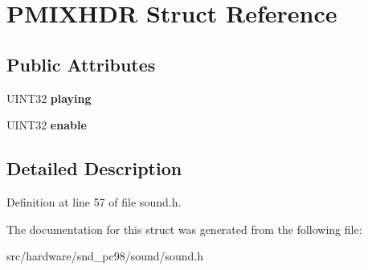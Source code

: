\hypertarget{structPMIXHDR}{\section{P\-M\-I\-X\-H\-D\-R Struct Reference}
\label{structPMIXHDR}
}
\subsection*{Public Attributes}
\begin{DoxyCompactItemize}
\item 
\hypertarget{structPMIXHDR_a9b1407b1f2909aac63d186571fedb0fa}{U\-I\-N\-T32 {\bfseries playing}}\label{structPMIXHDR_a9b1407b1f2909aac63d186571fedb0fa}

\item 
\hypertarget{structPMIXHDR_a17f9fb6e78450992721e82f1521f579b}{U\-I\-N\-T32 {\bfseries enable}}\label{structPMIXHDR_a17f9fb6e78450992721e82f1521f579b}

\end{DoxyCompactItemize}


\subsection{Detailed Description}


Definition at line 57 of file sound.\-h.



The documentation for this struct was generated from the following file\-:\begin{DoxyCompactItemize}
\item 
src/hardware/snd\-\_\-pc98/sound/sound.\-h\end{DoxyCompactItemize}
